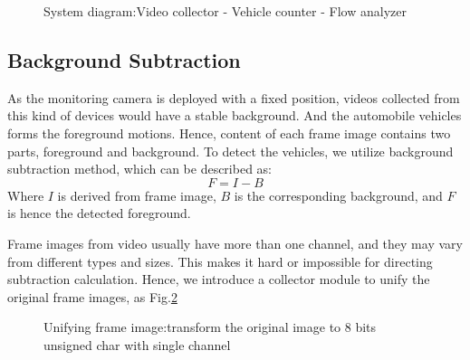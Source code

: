 \documentclass[draftclsnofoot,onecolumn]{IEEEtran}
\begin{document}
	\begin{figure}[!ht]
	\centering
	\caption{System diagram:Video collector - Vehicle counter - Flow analyzer}
	\label{fig:sysDiagram}
	\end{figure}
	
	
	\subsection{Background Subtraction}
	As the monitoring camera is deployed with a fixed position, videos collected from this kind of devices would have a stable background. And the automobile vehicles forms the foreground motions. Hence, content of each frame image contains two parts, foreground and background. To detect the vehicles, we utilize background subtraction method, which can be described as:
	\begin{equation}
	F = I  - B
	\label{eq:backgroundSubtraction}
	\end{equation}
	Where $I$ is derived from frame image, $B$ is the corresponding background, and $F$ is hence the detected foreground.
	
	Frame images from video usually have more than one channel, and they may vary from different types and sizes. This makes it hard or impossible for directing subtraction calculation. Hence, we introduce a collector module to unify the original frame images, as Fig.\ref{fig:unifyDiagram}
	\begin{figure}[!h]
	\centering
	\caption{Unifying frame image:transform the original image to 8 bits unsigned char with single channel}
	\label{fig:unifyDiagram}
	\end{figure}
	
\end{document}

